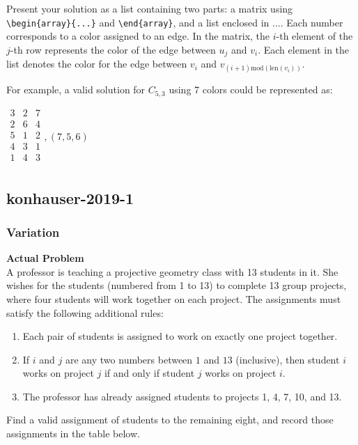 Present your solution as a list containing two parts: a matrix using \verb|\begin{array}{...}| and \verb|\end{array}|, and a list enclosed in $\boxed{...}$. Each number corresponds to a color assigned to an edge. In the matrix, the \( i \)-th element of the \( j \)-th row represents the color of the edge between \( u_j \) and \( v_i \). Each element in the list denotes the color for the edge between \( v_i \) and \( v_{(i+1) \text{mod}(\text{len}(v_i))} \).

For example, a valid solution for \( C_{5, 3} \) using 7 colors could be represented as:

$\boxed{
\begin{array}{ccc}
3 & 2 & 7 \\
2 & 6 & 4 \\
5 & 1 & 2 \\
4 & 3 & 1 \\
1 & 4 & 3 \\
\end{array},
(7, 5, 6)
}$

\subsection{konhauser-2019-1}
\subsubsection{Variation}
\textbf{Actual Problem}\\
A professor is teaching a projective geometry class with 13 students in it. She wishes for the students (numbered from 1 to 13) to complete 13 group projects, where four students will work together on each project. The assignments must satisfy the following additional rules:

\begin{enumerate}
    \item Each pair of students is assigned to work on exactly one project together.
    \item If $i$ and $j$ are any two numbers between $1$ and $13$ (inclusive), then student $i$ works on project $j$ if and only if student $j$ works on project $i$.
    \item The professor has already assigned students to projects 1, 4, 7, 10, and 13.
\end{enumerate}

Find a valid assignment of students to the remaining eight, and record those assignments in the table below.

